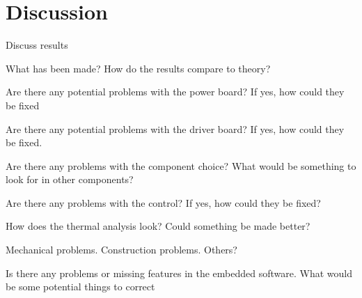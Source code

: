 \section{Discussion}
\label{sec:discussion}
Discuss results
 
What has been made? How do the results compare to theory?
 
Are there any potential problems with the power board?
If yes, how could they be fixed

Are there any potential problems with the driver board?
If yes, how could they be fixed.
 
Are there any problems with the component choice?
What would be something to look for in other components?

Are there any problems with the control?
If yes, how could they be fixed?

How does the thermal analysis look? Could something be made better?

Mechanical problems. Construction problems. Others?

Is there any problems or missing features in the embedded software. What would be some potential things to correct

 
 